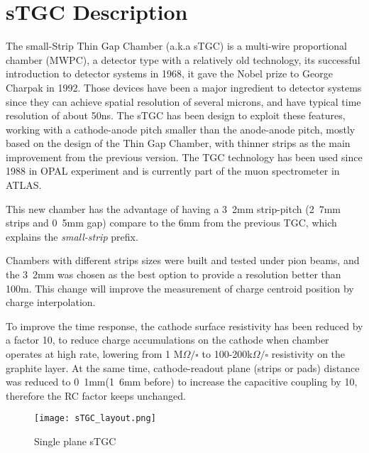 \section{sTGC Description}

The small-Strip Thin Gap Chamber (a.k.a sTGC) is a multi-wire proportional chamber (MWPC), a detector type
with a relatively old technology, its successful introduction to detector systems in 1968, it gave the Nobel prize to
George Charpak in 1992.  Those devices have been a major ingredient to detector systems since they can achieve spatial
resolution of several microns, and have typical time resolution of about 50ns.  The sTGC has been design to exploit
these features,  working with a cathode-anode pitch smaller than the anode-anode pitch, mostly based on the design of
the Thin Gap Chamber\cite{tgc}, with thinner strips as the main improvement from the previous version. The TGC technology
has been used since 1988 in OPAL experiment and is currently part of the muon spectrometer in ATLAS. \par
This new chamber has the advantage of having a \unit{3.2}{mm} strip-pitch (\unit{2.7}{mm} strips and \unit{0.5}{mm} gap) compare
to the \unit{6}{mm} from the previous TGC, which explains the {\it small-strip} prefix.\par
Chambers with different strips sizes were built and tested under pion beams, and the \unit{3.2}{mm} was chosen as the best
option\cite{stripwidth} to provide a resolution better than \unit{100}{\micro m}. 
This change will improve the
measurement of charge centroid position by charge interpolation.\par
To improve the time response, the cathode surface
resistivity has been reduced by a factor 10, to reduce charge accumulations on the cathode when chamber operates at
high rate, lowering from 1 M$\Omega/\square$ to 100-200k$\Omega / \square$ resistivity on the graphite layer.  At the
same time, cathode-readout plane (strips or pads) distance was reduced to \unit{0.1}{mm}(\unit{1.6}{mm} before) to
increase the capacitive coupling by 10, therefore the RC factor keeps unchanged.\par

\begin{figure}[ht]
		\centering
		\texttt{[image: sTGC\_layout.png]}
		\caption{Single plane sTGC}\label{fig:sTGC}
\end{figure}

